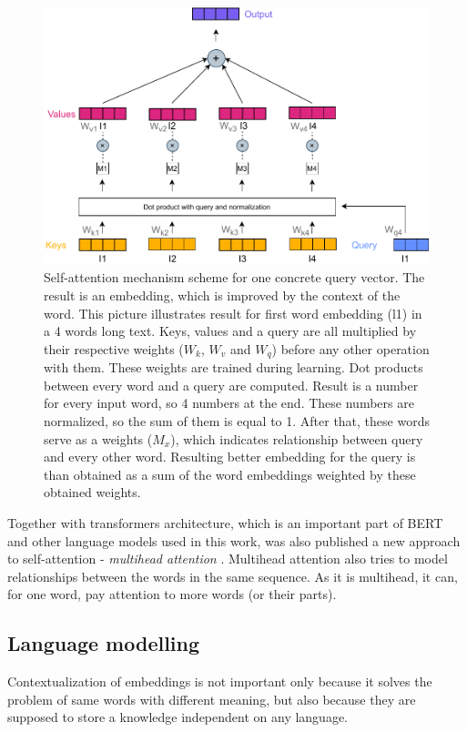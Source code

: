 \begin{figure}[h]
\label{pic:att_self}
\centering
\includegraphics[width=1\columnwidth]{../img/self_attention1}
\caption{Self-attention mechanism scheme for one concrete query vector. The result is an embedding, which is improved by the context of the word. This picture illustrates result for first word embedding (l1) in a 4 words long text. Keys, values and a query are all multiplied by their respective weights ($W_k$, $W_v$ and $W_q$) before any other operation with them. These weights are trained during learning. Dot products between every word and a query are computed. Result is a number for every input word, so 4 numbers at the end. These numbers are normalized, so the sum of them is equal to 1. After that, these words serve as a weights ($M_x$), which indicates relationship between query and every other word. Resulting better embedding for the query is than obtained as a sum of the word embeddings weighted by these obtained weights. 
}
\end{figure}

\par
Together with transformers architecture, which is an important part of BERT and other language models used in this work, was also published a new approach to self-attention - \textit{multihead attention} \citep{Vaswani2017}. Multihead attention also tries to model relationships between the words in the same sequence. As it is multihead, it can, for one word, pay attention to more words (or their parts).  

\subsection{Language modelling}
\label{sub:models}
Contextualization of embeddings is not important only because it solves the problem of same words with different meaning, but also because they are supposed to store a knowledge independent on any language. %

